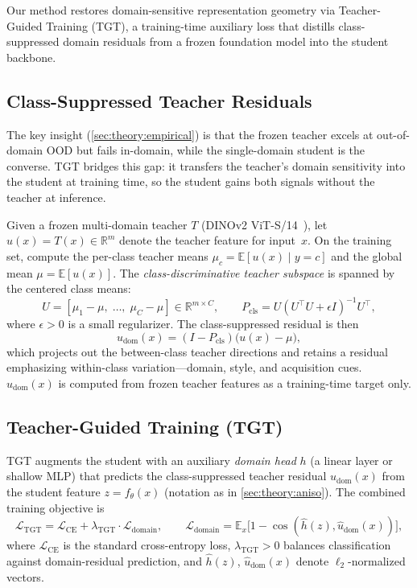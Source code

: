 \documentclass[runningheads]{llncs}
\begin{document}
Our method restores domain-sensitive representation geometry via Teacher-Guided Training (TGT), a training-time auxiliary loss that distills class-suppressed domain residuals from a frozen foundation model into the student backbone.

\subsection{Class-Suppressed Teacher Residuals}
\label{sec:method:residuals}

The key insight (\cref{sec:theory:empirical}) is that the frozen teacher excels at out-of-domain OOD but fails in-domain, while the single-domain student is the converse.
TGT bridges this gap: it transfers the teacher's domain sensitivity into the student at training time, so the student gains both signals without the teacher at inference.

Given a frozen multi-domain teacher $T$ (DINOv2 ViT-S/14~\cite{Oquab2024dinov2}), let $u(x) = T(x) \in \mathbb{R}^m$ denote the teacher feature for input~$x$.
On the training set, compute the per-class teacher means $\mu_c = \mathbb{E}[u(x) \mid y{=}c]$ and the global mean $\mu = \mathbb{E}[u(x)]$.
The \emph{class-discriminative teacher subspace} is spanned by the centered class means:
\begin{equation}
  U = [\mu_1{-}\mu,\;\ldots,\;\mu_C{-}\mu] \in \mathbb{R}^{m \times C}, \qquad
  P_{\mathrm{cls}} = U(U^\top U + \epsilon I)^{-1}U^\top,
  \label{eq:pcls}
\end{equation}
where $\epsilon > 0$ is a small regularizer.
The class-suppressed residual is then
\begin{equation}
  u_{\mathrm{dom}}(x) = (I - P_{\mathrm{cls}})\bigl(u(x) - \mu\bigr),
  \label{eq:udom}
\end{equation}
which projects out the between-class teacher directions and retains a residual emphasizing within-class variation---domain, style, and acquisition cues.
$u_{\mathrm{dom}}(x)$ is computed from frozen teacher features as a training-time target only.

\subsection{Teacher-Guided Training (TGT)}
\label{sec:method:tgt}

TGT augments the student with an auxiliary \emph{domain head} $h$ (a linear layer or shallow MLP) that predicts the class-suppressed teacher residual $u_{\mathrm{dom}}(x)$ from the student feature $z = f_\theta(x)$ (notation as in \cref{sec:theory:aniso}).
The combined training objective is
\begin{equation}
  \mathcal{L}_{\mathrm{TGT}} = \mathcal{L}_{\mathrm{CE}} + \lambda_{\mathrm{TGT}} \cdot \mathcal{L}_{\mathrm{domain}}, \qquad
  \mathcal{L}_{\mathrm{domain}} = \mathbb{E}_x\bigl[1 - \cos(\hat{h}(z), \hat{u}_{\mathrm{dom}}(x))\bigr],
  \label{eq:tgt}
\end{equation}
where $\mathcal{L}_{\mathrm{CE}}$ is the standard cross-entropy loss, $\lambda_{\mathrm{TGT}} > 0$ balances classification against domain-residual prediction, and $\hat{h}(z)$, $\hat{u}_{\mathrm{dom}}(x)$ denote $\ell_2$-normalized vectors.
\end{document}
